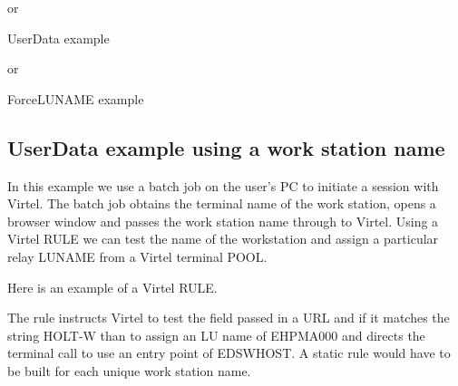 \documentclass[letterpaper,10pt,english]{sphinxmanual}
\begin{document}
or

            UserData example

or

          ForceLUNAME example

\ignorespaces 

\subsection{UserData example using a work station name}
\label{\detokenize{connectivity_guide:userdata-example-using-a-work-station-name}}\label{\detokenize{connectivity_guide:index-150}}
In this example we use a batch job on the user’s PC to initiate a session with Virtel. The batch job obtains the terminal name of the work station, opens a browser window and passes the work station name through to Virtel. Using a Virtel RULE we can test the name of the workstation and assign a particular relay LUNAME from a Virtel terminal POOL.

Here is an example of a Virtel RULE.

\begin{sphinxVerbatim}[commandchars=\\\{\}]
 
\end{sphinxVerbatim}

The rule instructs Virtel to test the  field passed in a URL and if it matches the string HOLT-W than to assign an LU name of EHPMA000 and directs the terminal call to use an entry point of EDSWHOST. A static rule would have to be built for each unique work station name.
\end{document}
